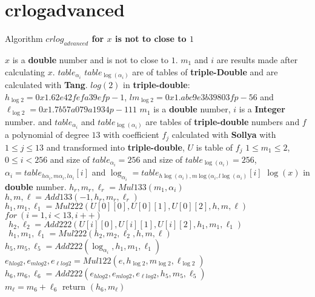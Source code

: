 \section*{crlogadvanced}
\begin{algorithm}[htbp]
  \caption{Algorithm \textbf{$crlog_{advanced}$ for $x$ is not to close to $1$ }}
\begin{algorithmic}[1]
\Condition $x$ is a \textbf{double} number and is not to close to $1$.
\Condition $m_1$ and $i$ are results made after calculating $x$.
\Condition $table_{\alpha_{i}}$  $table_{\log(\alpha_{i})}$ are of tables of \textbf{triple-Double} and are calculated with \textbf{Tang}.
\Condition $log(2)$ in \textbf{triple-double}: $h_{\log2} = 0x1.62e42fefa39efp-1$, $lm_{\log2} = 0x1.abc9e3b39803fp-56$ and $\ell_{\log2}= 0x1.7b57a079a1934p-111$
\Input $m_1$ is a \textbf{double} number, $i$ is a \textbf{Integer} number.
and $table_{\alpha_{i}}$ and $table_{\log(\alpha_{i})}$ are  tables of \textbf{triple-double} numbers and $f$ a polynomial of degree $13$ with coefficient $f_j$ calculated with \textbf{Sollya}
with $1\le j \le 13$ and transformed into \textbf{triple-double}, $U$ is table of $f_j$
\Condition $1 \le m_1 \le 2 $, $0 \le i < 256$ and size of $table_{\alpha_{i}} = 256$
and size of $table_{\log (\alpha_{i})} = 256$, $\alpha_i = table_{h\alpha_{i},m\alpha_{i},l\alpha_{i}}[i]$ and $\log_{\alpha_i} = table_{h\log (\alpha_{i}),m\log (\alpha_{i},l\log (\alpha_{i})}[i]$
\Output $\log(x)$ in \textbf{double} number.
\State $h_r,m_r,\ell_r = Mul133(m_1, \alpha_i )$\\
$h,m,\ell = Add133(-1,h_r,m_r,\ell_r)$\\
$h_1, m_1,\ell_1 = Mul222(U[0][0], U[0][1],U[0][2],h,m,\ell)$\\
$for \ (i = 1, i<13,i++)$\\
$\ \ h_2,\ell_2 = Add222(U[i][0], U[i][1],U[i][2], h_1, m_1, \ell_1)$\\
$\ \  h_1, m_1,\ell_1 = Mul222(h_2,m_2,\ell_2,h,m,\ell)$ \\
$h_5,m_5,\ell_5 = Add222(\log_{\alpha_i}, h_1, m_1,\ell_1)$\\
$e_{hlog2},e_{m log2},e_{\ell log2} = Mul122(e, h_{\log2}, m_{\log2}, \ell_{\log2})$\\
$h_6, m_6,\ell_6 = Add222(e_{hlog2},e_{m log2}, e_{\ell log2},h_5,m_5,\ell_5)$\\
$m_{\ell}= m_6+\ell_6$
return  $(h_6,m_{\ell})$
\end{algorithmic}
\label{algo:crlogadvanced}
\end{algorithm}

